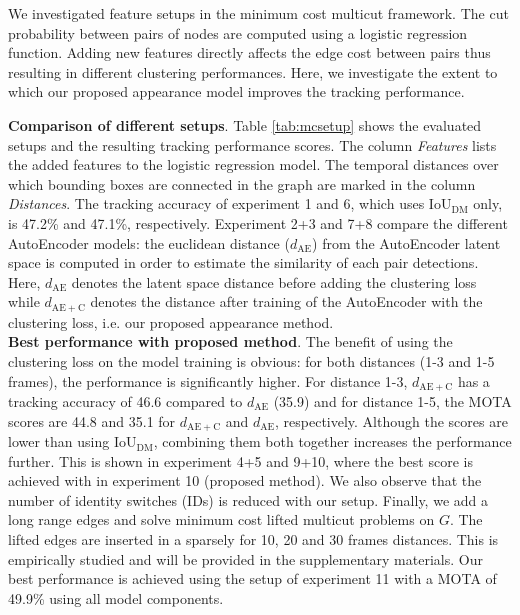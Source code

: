 We investigated feature setups in the minimum cost multicut framework. 
The cut probability between pairs of nodes are computed using a logistic regression function. 
Adding new features directly affects the edge cost between pairs thus resulting in different clustering performances. 
Here, we investigate the extent to which our proposed appearance model improves the tracking performance.

\noindent\textbf{Comparison of different setups}.
Table \ref{tab:mcsetup} shows the evaluated setups and the resulting tracking performance scores. %
The column \textit{Features} lists the added features to the logistic regression model. 
The temporal distances over which bounding boxes are connected in the graph are marked in the column \textit{Distances}. 
The tracking accuracy of experiment 1 and 6, which uses IoU$_{\mathrm{DM}}$ only, is 47.2\% and 47.1\%, respectively. 
Experiment 2+3 and 7+8 compare the different AutoEncoder models: the euclidean distance ($d_{\mathrm{AE}}$) from the AutoEncoder latent space is computed in order to estimate the similarity of each pair detections. 
Here, $d_{\mathrm{AE}}$ denotes the latent space distance before adding the clustering loss while $d_{\mathrm{AE+C}}$ denotes the distance after training of the AutoEncoder with the clustering loss, i.e. our proposed appearance method.\\

\noindent\textbf{Best performance with proposed method}.
The benefit of using the clustering loss on the model training is obvious: for both distances (1-3 and 1-5 frames), the performance is significantly higher. 
For distance 1-3, $d_{\mathrm{AE+C}}$ has a tracking accuracy of 46.6 compared to $d_{\mathrm{AE}}$ (35.9) and for distance 1-5, the MOTA scores are 44.8 and 35.1 for $d_{\mathrm{AE+C}}$ and $d_{\mathrm{AE}}$, respectively. 
Although the scores are lower than using IoU$_{\mathrm{DM}}$, combining them both together increases the performance further. 
This is shown in experiment 4+5 and 9+10, where the best score is achieved with in experiment 10 (proposed method).
We also observe that the number of identity switches (IDs) is reduced with our setup.
Finally, we add a long range edges and solve minimum cost lifted multicut problems on $G$. 
The lifted edges are inserted in a sparsely for 10, 20 and 30 frames distances. 
This is empirically studied and will be provided in the supplementary materials.
Our best performance is achieved using the setup of experiment 11 with a MOTA of 49.9\% using all model components.\\

